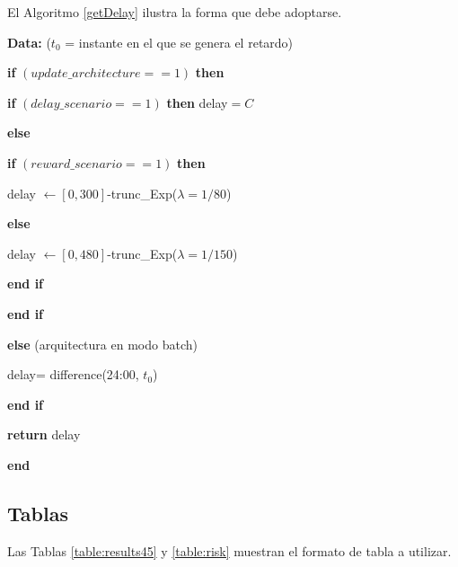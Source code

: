 {{El Algoritmo \ref{getDelay} ilustra la forma que debe adoptarse.
\begin{algorithm}[h]
{\bf  Data:} ($t_0$ = instante en el que se genera el retardo)
\medskip

\hspace{0.5em} {\bf if} $(update\_architecture==1)$ {\bf then}

\hspace{1.5em} {\bf if} $(delay\_scenario==1)$ {\bf then} delay$=C$

\hspace{1.5em} {\bf else}

\hspace{2.5em} {\bf if} $(reward\_scenario==1)$ {\bf then}

\hspace{3.5em} delay $\leftarrow [0,300]$-trunc\_Exp($\lambda=1/80$)

\hspace{2.5em} {\bf else}

\hspace{3.5em} delay $\leftarrow [0,480]$-trunc\_Exp($\lambda=1/150$)

\hspace{2.5em} {\bf end if}

\hspace{1.5em} {\bf end if}

\hspace{0.5em} {\bf else} (arquitectura en modo batch)

\hspace{1.5em} delay= difference(24:00, $t_0$)

\hspace{0.5em} {\bf end if}

\hspace{0.5em}  {\bf return} delay

{\bf end}
\caption{$getDelay(t_0)$}
\label{getDelay}
\end{algorithm}


\subsection{Tablas}
Las Tablas \ref{table:results45} y \ref{table:risk} muestran el formato de tabla a utilizar.

}}

